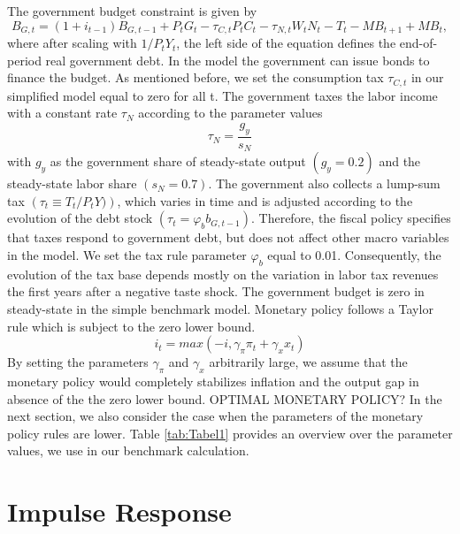 \documentclass[12pt,a4paper,oneside,titlepage]{article}
\begin{document}
The government budget constraint is given by
\begin{equation}
B_{G,t} = \left(1 + i_{t-1}\right)B_{G,t-1} + P_tG_t - \tau_{C,t}P_tC_t - \tau_{N,t}W_tN_t - T_t - MB_{t+1} + MB_t,  \nonumber
\end{equation}
where after scaling with $1/ P_tY_t$, the left side of the equation defines the end-of-period real government debt. In the model the government can issue bonds to finance the budget. As mentioned before, we set the consumption tax $\tau_{C,t}$ in our simplified model equal to zero for all t. The government taxes the labor income with a constant rate $\tau_N$ according to the parameter values \[\tau_N = \frac{g_y}{s_N}\] with $g_y$ as the government share of steady-state output $\left(g_y = 0.2 \right)$ and the steady-state labor share $\left(s_N = 0.7\right)$.
The government also collects a lump-sum tax $\left(\tau_t \equiv T_t/P_tY)\right)$, which varies in time and is adjusted according to the evolution of the debt stock $\left(\tau_t = \varphi_b b_{G,t-1}\right)$. Therefore, the fiscal policy specifies that taxes respond to government debt, but does not affect other macro variables in the model. We set the tax rule parameter $\varphi_b$ equal to 0.01. Consequently, the evolution of the tax base depends mostly on the variation in labor tax revenues the first years after a negative taste shock. The government budget is zero in steady-state in the simple benchmark model.\newline
Monetary policy follows a Taylor rule which is subject to the zero lower bound.
\begin{equation}
i_t = max \left(-i, \gamma_{\pi} \pi_t + \gamma_x x_t\right)  \nonumber
\end{equation}
By setting the parameters $\gamma_{\pi}$ and $\gamma_x$ arbitrarily large, we assume that the monetary policy would completely stabilizes inflation and the output gap in absence of the the zero lower bound. OPTIMAL MONETARY POLICY?  In the next section, we also consider the case when the parameters of the monetary policy rules are lower.\newline
Table \ref{tab:Tabel1} provides an overview over the parameter values, we use in our benchmark calculation.
\bigskip


\section{Impulse Response}
\end{document}
